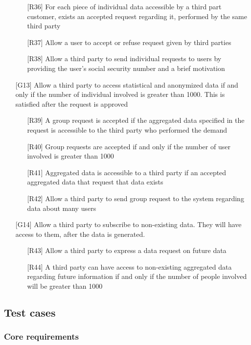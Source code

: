 \begin{itemize}
\begin{itemize}
	\item[{[R36]}] For each piece of individual data accessible by a third part customer, exists an accepted request regarding it, performed by the same third party 
	\item[{[R37]}] Allow a user to accept or refuse request given by third parties
	\item[{[R38]}] Allow a third party to send individual requests to users by providing the user's social security number and a brief motivation
	\end{itemize}
\item[{[G13]}] Allow a third party to access statistical and anonymized data if and only if the number of individual involved is greater than 1000. This is satisfied after the request is approved  
	\begin{itemize}
	\item[{[R39]}] A group request is accepted if the aggregated data specified in the request is accessible to the third party who performed the demand
	\item[{[R40]}] Group requests are accepted if and only if the number of user involved is greater than 1000
	\item[{[R41]}] Aggregated data is accessible to a third party if an accepted aggregated data that request that data exists
	\item[{[R42]}] Allow a third party to send group request to the system regarding data about many users
	\end{itemize}
\item[{[G14]}] Allow a third party to subscribe to non-existing data. They will have access to them, after the data is generated. 
	\begin{itemize}
	\item[{[R43]}] Allow a third party to express a data request on future data
	\item[{[R44]}] A third party can have access to non-existing aggregated data regarding future information if and only if the number of people involved will be greater than 1000
	\end{itemize}
\end{itemize}


\newpage

\subsection{Test cases}
\subsubsection{Core requirements}

